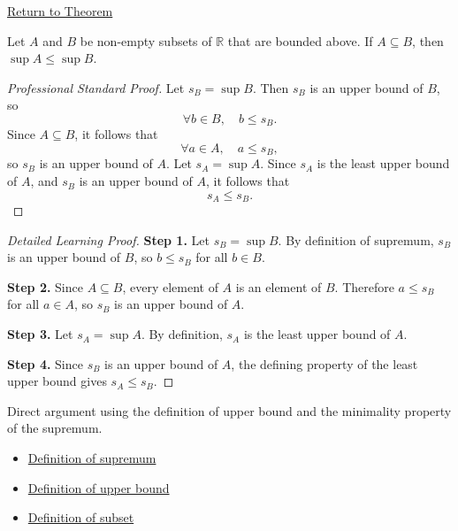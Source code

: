\newpage
{}
\label{prf:supremum-is-monotone-under-inclusion}

\begin{remark*}[Return]
\hyperref[thm:supremum-is-monotone-under-inclusion]{Return to Theorem}
\end{remark*}

\begin{theorem*}
Let $A$ and $B$ be non-empty subsets of $\mathbb{R}$ that are bounded above. If $A \subseteq B$, then $\sup A \le \sup B$.
\end{theorem*}

\begin{proof}[Professional Standard Proof]
\LRAProofBodyStart
Let $s_B = \sup B$. Then $s_B$ is an upper bound of $B$, so
\[
\forall b \in B,\quad b \le s_B.
\]
Since $A \subseteq B$, it follows that
\[
\forall a \in A,\quad a \le s_B,
\]
so $s_B$ is an upper bound of $A$. Let $s_A = \sup A$. Since $s_A$ is the least upper bound of $A$, and $s_B$ is an upper bound of $A$, it follows that
\[
s_A \le s_B.
\]
\end{proof}

\begin{proof}[Detailed Learning Proof]
\LRAProofBodyStart

\textbf{Step 1.} Let $s_B = \sup B$. By definition of supremum, $s_B$ is an upper bound of $B$, so $b \le s_B$ for all $b \in B$.

\textbf{Step 2.} Since $A \subseteq B$, every element of $A$ is an element of $B$. Therefore $a \le s_B$ for all $a \in A$, so $s_B$ is an upper bound of $A$.

\textbf{Step 3.} Let $s_A = \sup A$. By definition, $s_A$ is the least upper bound of $A$.

\textbf{Step 4.} Since $s_B$ is an upper bound of $A$, the defining property of the least upper bound gives $s_A \le s_B$.
\end{proof}

\begin{remark*}
Direct argument using the definition of upper bound and the minimality property of the supremum.
\end{remark*}

\begin{dependencies}
\begin{itemize}
  \item \hyperref[def:supremum]{Definition of supremum}
  \item \hyperref[def:upper-bound]{Definition of upper bound}
  \item \hyperref[def:subset]{Definition of subset}
\end{itemize}
\end{dependencies}

\clearpage
